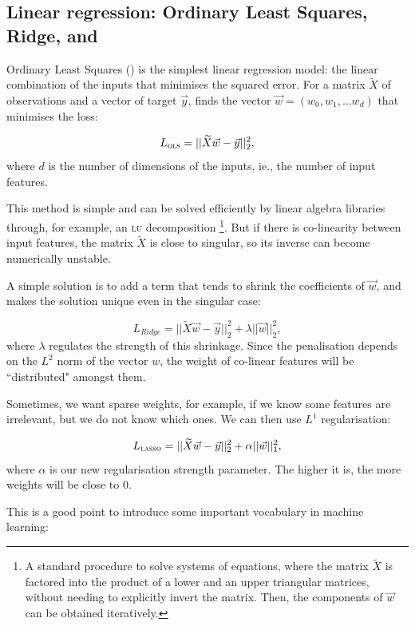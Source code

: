 \subsection[Linear regression]{Linear regression: Ordinary Least Squares, Ridge, and \LASSO}\label{sec:linear}
Ordinary Least Squares (\OLS) is the simplest linear regression model: the linear combination of the inputs that minimises the squared error.
For a matrix $ \widetilde X$ of observations and a vector of target $\vec y$, \OLS{} finds the vector $\vec w = (w_0, w_1, ... w_d)$ that minimises the loss:

\begin{equation*}
 L_{\textsc{ols}} = || \widetilde  X \vec w - \vec y ||_2 ^2,
\end{equation*}
where $d$ is the number of dimensions of the inputs, ie., the number of input features.

This method is simple and can be solved efficiently by linear algebra libraries through, for example, an \textsc{lu}{} decomposition \footnote{A standard procedure to solve systems of equations, where the matrix $\widetilde{X}$ is factored into the product of a lower and an upper triangular matrices, without needing to explicitly invert the matrix. Then, the components of $\vec w$ can be obtained iteratively.}.
But if there is co-linearity between input features, the matrix $ \widetilde X$ is close to singular, so its inverse can become numerically unstable.

A simple solution  is to add a term that tends to shrink the coefficients of $\vec w$, and makes the solution unique even in the singular case:

\[ L_{Ridge} = || \widetilde  X \vec w - \vec y ||_2 ^2 + \lambda ||\vec w||_2^2,\]
where $\lambda$ regulates the strength of this shrinkage.
Since the penalisation depends on the $L^2$ norm of the vector $w$, the weight of co-linear features will be ``distributed" amongst them.

Sometimes, we want sparse weights, \sidenote{\LASSO} for example, if we know some features are irrelevant, but we do not know which ones.
We can then use $L^1$ regularisation:

\[ L_{\textsc{lasso}} = || \widetilde X \vec w - \vec y ||_2 ^2 + \alpha ||\vec w||_1^2,\]
where $\alpha$ is our new regularisation strength parameter.
The higher it is, the more weights will be close to $0$.

This is a good point to introduce
some important vocabulary in machine learning:

